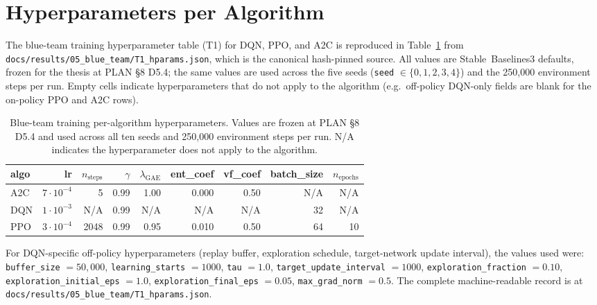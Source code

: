 \section{Hyperparameters per Algorithm}\label{app:hparams}

The blue-team training hyperparameter table (T1) for DQN, PPO, and A2C is reproduced in Table~\ref{tab:hparams} from \texttt{docs/results/05\_blue\_team/T1\_hparams.json}, which is the canonical hash-pinned source. All values are Stable~Baselines3 defaults, frozen for the thesis at PLAN \S8 D5.4; the same values are used across the five seeds (\texttt{seed} $\in \{0, 1, 2, 3, 4\}$) and the 250{,}000 environment steps per run. Empty cells indicate hyperparameters that do not apply to the algorithm (e.g.\ off-policy DQN-only fields are blank for the on-policy PPO and A2C rows).

\begin{table}[!htbp]
\centering
\caption{Blue-team training per-algorithm hyperparameters. Values are frozen at PLAN \S8 D5.4 and used across all ten seeds and 250{,}000 environment steps per run. N/A indicates the hyperparameter does not apply to the algorithm.}
\label{tab:hparams}
\small
\begin{tabular}{l r r r r r r r r}
\toprule
algo & lr & $n_{\text{steps}}$ & $\gamma$ & $\lambda_{\text{GAE}}$ & ent\_coef & vf\_coef & batch\_size & $n_{\text{epochs}}$ \\
\midrule
A2C & $7\!\cdot\!10^{-4}$ & 5    & 0.99 & 1.00 & 0.000 & 0.50 & N/A  & N/A  \\
DQN & $1\!\cdot\!10^{-3}$ & N/A  & 0.99 & N/A  & N/A   & N/A  & 32   & N/A  \\
PPO & $3\!\cdot\!10^{-4}$ & 2048 & 0.99 & 0.95 & 0.010 & 0.50 & 64   & 10   \\
\bottomrule
\end{tabular}
\end{table}
\par\smallskip{}

For DQN-specific off-policy hyperparameters (replay buffer, exploration schedule, target-network update interval), the values used were: \texttt{buffer\_size} $= 50{,}000$, \texttt{learning\_starts} $= 1000$, \texttt{tau} $= 1.0$, \texttt{target\_update\_interval} $= 1000$, \texttt{exploration\_fraction} $= 0.10$, \texttt{exploration\_initial\_eps} $= 1.0$, \texttt{exploration\_final\_eps} $= 0.05$, \texttt{max\_grad\_norm} $= 0.5$. The complete machine-readable record is at \texttt{docs/results/05\_blue\_team/T1\_hparams.json}.


